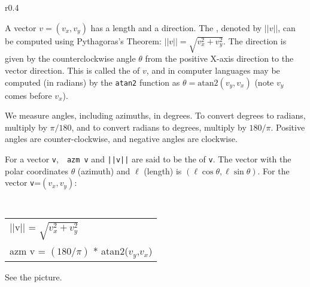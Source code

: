 \documentclass[12pt]{article}
\begin{document}
\begin{minipage}{\textwidth}\raggedright
\begin{wrapfigure}{r}{0.4\textwidth}
\end{wrapfigure}
A vector $v=(v_x,v_y)$ has a length and a direction.
The , denoted by $||v||$, can be computed using
Pythagoras's Theorem: $||v||=\sqrt{v_x^2+v_y^2}$.  The
direction is given by the counterclockwise angle $\theta$ from
the positive X-axis direction to the vector direction.
This is called the  of $v$, and in computer
languages may be computed (in radians) by the {\tt atan2} function as
$\theta = \mathrm{atan2}(v_y,v_x)$ (note $v_y$ comes before $v_x$).
\end{minipage}

We measure angles, including azimuths, in degrees.  To convert degrees
to radians, multiply by $\pi/180$, and to convert radians to degrees,
multiply by $180/\pi$.  Positive angles are counter-clockwise, and
negative angles are clockwise.

For a vector {\tt v},~~{\tt azm v} and {\tt ||v||} are said to be
the  of {\tt v}.
The vector with the polar coordinates $\theta$ (azimuth) and $\ell$ (length) is
$(\ell \cos\theta,\ell \sin\theta)$.  For the vector {\tt v}=$(v_x,v_y)$:
\begin{center}
\tt
\begin{tabular}{l}
||v|| = $\sqrt{v_x^2+v_y^2}$ \\
azm v = $(180/\pi)$ * atan2($v_y$,$v_x$)
\end{tabular}
\end{center}
See the picture.
\end{document}
